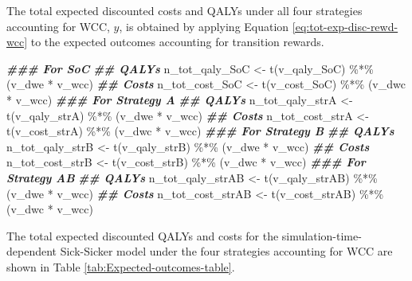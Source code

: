 \documentclass[
]{article}
\newenvironment{Shaded}{\begin{snugshade}}{\end{snugshade}}
\newcommand{\DocumentationTok}[1]{\textcolor[rgb]{0.56,0.35,0.01}{\textbf{\textit{#1}}}}
\newcommand{\FunctionTok}[1]{\textcolor[rgb]{0.00,0.00,0.00}{#1}}
\newcommand{\NormalTok}[1]{#1}
\newcommand{\OtherTok}[1]{\textcolor[rgb]{0.56,0.35,0.01}{#1}}
\newcommand{\SpecialCharTok}[1]{\textcolor[rgb]{0.00,0.00,0.00}{#1}}
\begin{document}
The total expected discounted costs and QALYs under all four strategies accounting for WCC, \(y\), is obtained by applying Equation \eqref{eq:tot-exp-disc-rewd-wcc} to the expected outcomes accounting for transition rewards.

\begin{Shaded}
\begin{Highlighting}[]
\DocumentationTok{\#\#\# For SoC}
\DocumentationTok{\#\# QALYs}
\NormalTok{n\_tot\_qaly\_SoC }\OtherTok{\textless{}{-}} \FunctionTok{t}\NormalTok{(v\_qaly\_SoC) }\SpecialCharTok{\%*\%}\NormalTok{ (v\_dwe }\SpecialCharTok{*}\NormalTok{ v\_wcc)}
\DocumentationTok{\#\# Costs}
\NormalTok{n\_tot\_cost\_SoC }\OtherTok{\textless{}{-}} \FunctionTok{t}\NormalTok{(v\_cost\_SoC) }\SpecialCharTok{\%*\%}\NormalTok{ (v\_dwc }\SpecialCharTok{*}\NormalTok{ v\_wcc)}
\DocumentationTok{\#\#\# For Strategy A}
\DocumentationTok{\#\# QALYs}
\NormalTok{n\_tot\_qaly\_strA }\OtherTok{\textless{}{-}} \FunctionTok{t}\NormalTok{(v\_qaly\_strA) }\SpecialCharTok{\%*\%}\NormalTok{ (v\_dwe }\SpecialCharTok{*}\NormalTok{ v\_wcc)}
\DocumentationTok{\#\# Costs}
\NormalTok{n\_tot\_cost\_strA }\OtherTok{\textless{}{-}} \FunctionTok{t}\NormalTok{(v\_cost\_strA) }\SpecialCharTok{\%*\%}\NormalTok{ (v\_dwc }\SpecialCharTok{*}\NormalTok{ v\_wcc)}
\DocumentationTok{\#\#\# For Strategy B}
\DocumentationTok{\#\# QALYs}
\NormalTok{n\_tot\_qaly\_strB }\OtherTok{\textless{}{-}} \FunctionTok{t}\NormalTok{(v\_qaly\_strB) }\SpecialCharTok{\%*\%}\NormalTok{ (v\_dwe }\SpecialCharTok{*}\NormalTok{ v\_wcc)}
\DocumentationTok{\#\# Costs}
\NormalTok{n\_tot\_cost\_strB }\OtherTok{\textless{}{-}} \FunctionTok{t}\NormalTok{(v\_cost\_strB) }\SpecialCharTok{\%*\%}\NormalTok{ (v\_dwc }\SpecialCharTok{*}\NormalTok{ v\_wcc)}
\DocumentationTok{\#\#\# For Strategy AB}
\DocumentationTok{\#\# QALYs}
\NormalTok{n\_tot\_qaly\_strAB }\OtherTok{\textless{}{-}} \FunctionTok{t}\NormalTok{(v\_qaly\_strAB) }\SpecialCharTok{\%*\%}\NormalTok{ (v\_dwe }\SpecialCharTok{*}\NormalTok{ v\_wcc)}
\DocumentationTok{\#\# Costs}
\NormalTok{n\_tot\_cost\_strAB }\OtherTok{\textless{}{-}} \FunctionTok{t}\NormalTok{(v\_cost\_strAB) }\SpecialCharTok{\%*\%}\NormalTok{ (v\_dwc }\SpecialCharTok{*}\NormalTok{ v\_wcc)}
\end{Highlighting}
\end{Shaded}

The total expected discounted QALYs and costs for the simulation-time-dependent Sick-Sicker model under the four strategies accounting for WCC are shown in Table \ref{tab:Expected-outcomes-table}.
\end{document}
